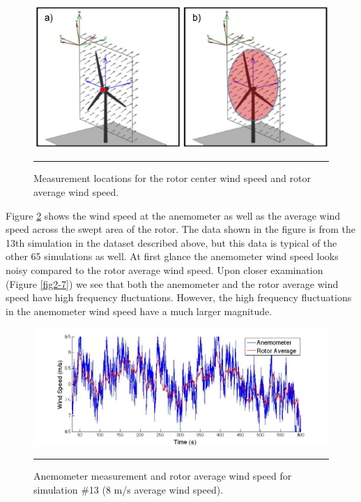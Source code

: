 \begin{figure}[htbp]
	\centering
		\includegraphics[width = \linewidth]{Figures/ch2Figures/fig2-4.jpg}
		\rule{35em}{0.5pt}
	\caption{Measurement locations for the rotor center wind speed and rotor average wind speed.}
	\label{fig2-4}
\end{figure}

Figure \ref{fig2-6} shows the wind speed at the anemometer as well as the average wind speed across the swept area of the rotor. The data shown in the figure is from the 13th simulation in the dataset described above, but this data is typical of the other 65 simulations as well. At first glance the anemometer wind speed looks noisy compared to the rotor average wind speed. Upon closer examination (Figure \ref{fig2-7}) we see that both the anemometer and the rotor average wind speed have high frequency fluctuations. However, the high frequency fluctuations in the anemometer wind speed have a much larger magnitude. 

\begin{figure}[htbp]
	\centering
		\includegraphics[trim = {3cm 0 2.5cm 0}, clip, width = \linewidth]{Figures/ch2Figures/fig2-6.jpg}
		\rule{35em}{0.5pt}
	\caption{Anemometer measurement and rotor average wind speed for simulation \#13 (8 m/s average wind speed).}
	\label{fig2-6}
\end{figure}


